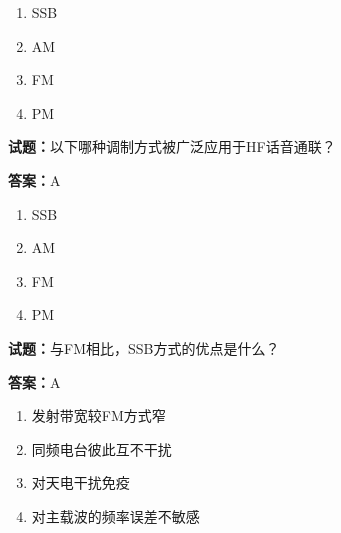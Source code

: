 \documentclass{ctexbook}
\begin{document}
\begin{enumerate}[leftmargin=3em]
  \item SSB 

  \item AM 

  \item FM 

  \item PM 

\end{enumerate}





\vspace{1em}

\textbf{试题：}以下哪种调制方式被广泛应用于HF话音通联？ 

\textbf{答案：}A 

\begin{enumerate}[leftmargin=3em]
  \item SSB 

  \item AM 

  \item FM 

  \item PM 

\end{enumerate}






\vspace{1em}

\textbf{试题：}与FM相比，SSB方式的优点是什么？ 

\textbf{答案：}A 

\begin{enumerate}[leftmargin=3em]
  \item 发射带宽较FM方式窄 

  \item 同频电台彼此互不干扰 

  \item 对天电干扰免疫 

  \item 对主载波的频率误差不敏感 

\end{enumerate}


\end{document}
